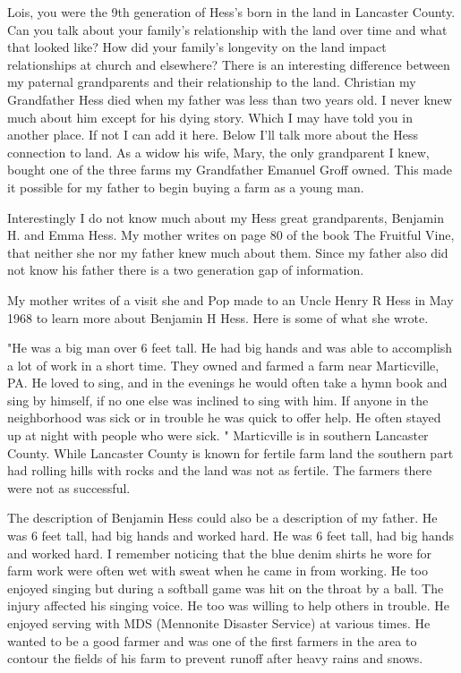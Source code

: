 Lois, you were the 9th generation of Hess's born in the land in Lancaster County.
Can you talk about your family's relationship with the land over time and what that looked like? How did your family's longevity on the land impact relationships at church and elsewhere?
There is an interesting difference between my paternal grandparents and their relationship to the land.
Christian my Grandfather Hess died when my father was less than two years old.
I never knew much about him except for his dying story.
Which I may have told you in another place.
If not I can add it here.
Below I'll talk more about the Hess connection to land.
As a widow his wife, Mary, the only grandparent I knew, bought one of the three farms my Grandfather Emanuel Groff owned.
This made it possible for my father to begin buying a farm as a young man.

Interestingly I do not know much about my Hess great grandparents, Benjamin H.
and Emma Hess.
My mother writes on page 80 of the book The Fruitful Vine, that neither she nor my father knew much about them.
Since my father also did not know his father there is a two generation gap of information.

My mother writes of a visit she and Pop made to an Uncle Henry R Hess in May 1968 to learn more about Benjamin H Hess.
Here is some of what she wrote.

      "He was a big man over 6 feet tall.
He had big hands and was able to accomplish a lot of work in a short time.
They owned and farmed a farm near Marticville, PA.
He loved to sing, and in the evenings he would often take a hymn book and sing by himself, if no one else was inclined to sing with him.
If anyone in the neighborhood was sick or in trouble he was quick to offer help.
He often stayed up at night with people who were sick.
"
Marticville is in southern Lancaster County.
While Lancaster County is known for fertile farm land the southern part had rolling hills with rocks and the land was not as fertile.
The farmers there were not as successful.

The description of Benjamin Hess could also be a description of my father.
He was 6 feet tall, had big hands and worked hard.
He was 6 feet tall, had big hands and worked hard.
I remember noticing that the blue denim shirts he wore for farm work were often wet with sweat when he came in from working.
He too enjoyed singing but during a softball game was hit on the throat by a ball.
The injury affected his singing voice.
He too was willing to help others in trouble.
He enjoyed serving with MDS (Mennonite Disaster Service) at various times.
He wanted to be a good farmer and was one of the first farmers in the area to contour the fields of his farm to prevent runoff after heavy rains and snows.

